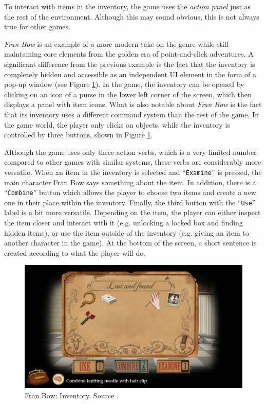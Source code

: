 To interact with items in the inventory, the game uses the \textit{action panel} just as the rest of the environment. Although this may sound obvious, this is not always true for other games. 

\textit{Fran Bow} is an example of a more modern take on the genre while still maintaining core elements from the golden era of point-and-click adventures.  A significant difference from the previous example is the fact that the inventory is completely hidden and accessible as an independent UI element in the form of a pop-up window (see Figure \ref{fig:I-FranBow}). In the game, the inventory can be opened by clicking on an icon of a purse in the lower left corner of the screen, which then displays a panel with item icons. What is also notable about \textit{Fran Bow} is the fact that its inventory uses a different command system than the rest of the game. In the game world, the player only clicks on objects, while the inventory is controlled by three buttons, shown in Figure \ref{fig:I-FranBow}. 

Although the game uses only three action verbs, which is a very limited number compared to other games with similar systems, these verbs are considerably more versatile. When an item in the inventory is selected and “\texttt{Examine}” is pressed, the main character Fran Bow says something about the item. In addition, there is a “\texttt{Combine}” button which allows the player to choose two items and create a new one in their place within the inventory. Finally, the third button with the “\texttt{Use}” label is a bit more versatile. Depending on the item, the player can either inspect the item closer and interact with it (e.g. unlocking a locked box and finding hidden items), or use the item outside of the inventory (e.g. giving an item to another character in the game). At the bottom of the screen, a short sentence is created according to what the player will do.

\begin{figure}[H]
\centering
\includegraphics[width=.75\linewidth]{img/Fran_Bow.png}
\caption{Fran Bow: Inventory. Source \cite{FranBow}.}
\label{fig:I-FranBow}
\end{figure}

